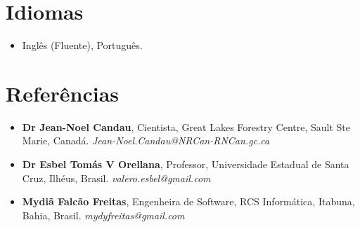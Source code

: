 \documentclass[9pt, a4paper, oneside, final]{scrartcl} %
\begin{document}

\section{Idiomas}

\begin{itemize} \itemsep1pt \parskip0pt 
  \item Inglês (Fluente), Português.
\end{itemize}



\section{Referências}

\begin{itemize} \itemsep2pt \parskip0pt 
\item \textbf{Dr Jean-Noel Candau}, Cientista, Great Lakes Forestry Centre, Sault Ste Marie, Canadá. \textit{Jean-Noel.Candau@NRCan-RNCan.gc.ca}
\item \textbf{Dr Esbel Tomás V Orellana}, Professor, Universidade Estadual de Santa Cruz, Ilhéus, Brasil. \textit{valero.esbel@gmail.com} 
\item \textbf{Mydiã Falcão Freitas}, Engenheira de Software, RCS Informática, Itabuna, Bahia, Brasil. \textit{mydyfreitas@gmail.com} 
\end{itemize}

\end{document}
